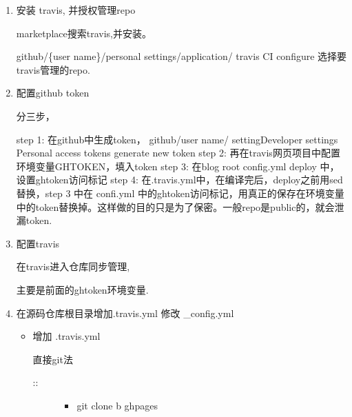 \documentclass[letterpaper,12pt,english]{sphinxmanual}
\begin{document}
\begin{enumerate}
%
\item {} 
安装 travis, 并授权管理repo

marketplace搜索travis,并安装。

github/\{user name\}/personal settings/application/ travis CI configure
选择要travis管理的repo.

\item {} 
配置github token

分三步，

\begin{sphinxVerbatim}[commandchars=\\\{\}]
step 1: 在github中生成token，
        github/\PYGZob{}user name\PYGZcb{}/\PYGZhy{}\PYGZgt{} setting\PYGZhy{}\PYGZgt{}Developer settings\PYGZhy{}\PYGZgt{} Personal access tokens \PYGZhy{}\PYGZgt{} generate new token
step 2: 再在travis网页项目中配置环境变量\PYGZdl{}GH\PYGZus{}TOKEN，填入token
step 3: 在blog root \PYGZus{}config.yml deploy 中，设置gh\PYGZus{}token访问标记
step 4: 在.travis.yml中，在编译完后，deploy之前用sed替换，step 3 中在 \PYGZus{}confi.yml 中的gh\PYGZus{}token访问标记，用真正的保存在环境变量中的token替换掉。这样做的目的只是为了保密。一般repo是public的，就会泄漏token.
\end{sphinxVerbatim}

\item {} 
配置travis

在travis进入仓库同步管理, 

主要是前面的gh\sphinxhyphen{}token环境变量.

\item {} 
在源码仓库根目录增加.travis.yml 修改 \_config.yml
\begin{itemize}
\item {} 
增加 .travis.yml

直接git法
\begin{description}
\item[{::}] \leavevmode\begin{itemize}
\item {} 
git clone \sphinxhyphen{}b gh\sphinxhyphen{}pages 

\end{itemize}

\end{description}


\end{itemize}
\end{enumerate}
\end{document}

